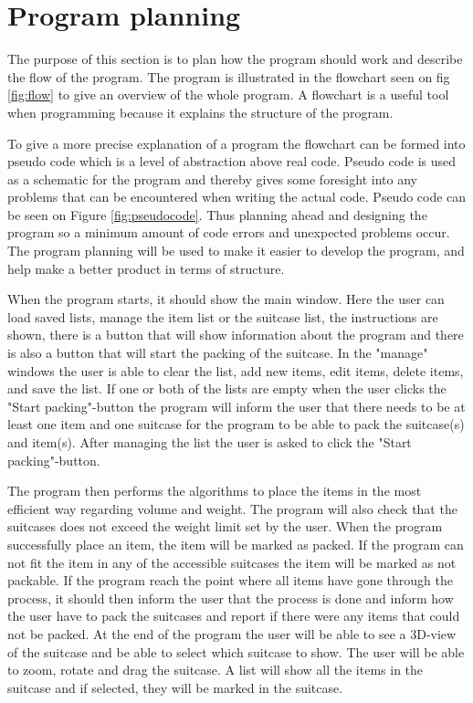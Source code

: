 \section{Program planning}
The purpose of this section is to plan how the program should work and describe the flow of the program. The program is illustrated in the flowchart seen on fig \ref{fig:flow} to give an overview of the whole program. A flowchart is a useful tool when programming because it explains the structure of the program.

To give a more precise explanation of a program the flowchart can be formed into pseudo code which is a level of abstraction above real code. Pseudo code is used as a schematic for the program and thereby gives some foresight into any problems that can be encountered when writing the actual code. Pseudo code can be seen on Figure \ref{fig:pseudocode}.
Thus planning ahead and designing the program so a minimum amount of code errors and unexpected problems occur. The program planning will be used to make it easier to develop the program, and help make a better product in terms of structure.

When the program starts, it should show the main window. Here the user can load saved lists, manage the item list or the suitcase list, the instructions are shown, there is a button that will show information about the program and there is also a button that will start the packing of the suitcase. In the "manage" windows the user is able to clear the list, add new items, edit items, delete items, and save the list. If one or both of the lists are empty when the user clicks the "Start packing"-button the program will inform the user that there needs to be at least one item and one suitcase for the program to be able to pack the suitcase(s) and item(s). After managing the list the user is asked to click the "Start packing"-button.

The program then performs the algorithms to place the items in the most efficient way regarding volume and weight. The program will also check that the suitcases does not exceed the weight limit set by the user.
When the program successfully place an item, the item will be marked as packed. If the program can not fit the item in any of the accessible suitcases the item will be marked as not packable. If the program reach the point where all items have gone through the process, it should then inform the user that the process is done and inform how the user have to pack the suitcases and report if there were any items that could not be packed.
At the end of the program the user will be able to see a 3D-view of the suitcase and be able to select which suitcase to show. The user will be able to zoom, rotate and drag the suitcase. A list will show all the items in the suitcase and if selected, they will be marked in the suitcase.


